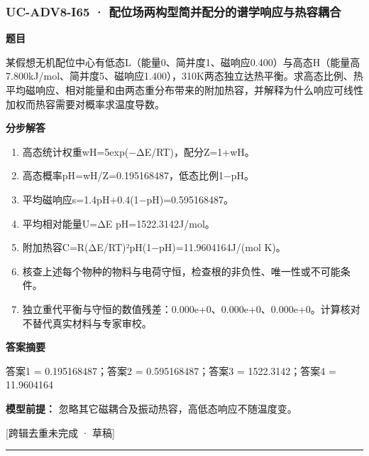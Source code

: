 \documentclass[UTF8,11pt,a4paper]{ctexart}
\begin{document}
\subsubsection*{UC-ADV8-I65 · 配位场两构型简并配分的谱学响应与热容耦合}
\noindent\textbf{题目}\par
某假想无机配位中心有低态L（能量0、简并度1、磁响应0.400）与高态H（能量高7.800kJ/mol、简并度5、磁响应1.400），310K两态独立达热平衡。求高态比例、热平均磁响应、相对能量和由两态重分布带来的附加热容，并解释为什么响应可线性加权而热容需要对概率求温度导数。\par
\medskip\noindent\textbf{分步解答}
\begin{enumerate}
\item 高态统计权重wH=5exp(−ΔE/RT)，配分Z=1+wH。
\item 高态概率pH=wH/Z=0.195168487，低态比例1−pH。
\item 平均磁响应s=1.4pH+0.4(1−pH)=0.595168487。
\item 平均相对能量U=ΔE pH=1522.3142J/mol。
\item 附加热容C=R(ΔE/RT)²pH(1−pH)=11.9604164J/(mol K)。
\item 核查上述每个物种的物料与电荷守恒，检查根的非负性、唯一性或不可能条件。
\item 独立重代平衡与守恒的数值残差：0.000e+0、0.000e+0、0.000e+0。计算核对不替代真实材料与专家审校。
\end{enumerate}
\noindent\textbf{答案摘要}\par
答案1 = 0.195168487；答案2 = 0.595168487；答案3 = 1522.3142；答案4 = 11.9604164\par
\noindent\textbf{模型前提：}
忽略其它磁耦合及振动热容，高低态响应不随温度变。\par
\noindent\textcolor{red!65!black}{[跨辑去重未完成 · 草稿]} \par
\medskip\hrule\medskip
{}
\end{document}
